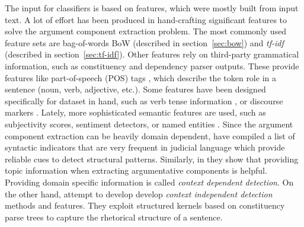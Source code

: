 The input for classifiers is based on features, which were mostly built from
input text.  A lot of effort has been produced in hand-crafting significant
features to solve the argument component extraction problem.  The most commonly
used feature sets are bag-of-words BoW (described in section~\ref{sec:bow}) and
\emph{tf-idf} (described in section~\ref{sec:tf-idf}). Other features rely on
third-party grammatical information, such as constituency and dependency parser
outputs. These provide features like part-of-speech (POS) tags
\citep{manning2011part}, which describe the token role in a sentence (noun,
verb, adjective, etc.).
Some features have been designed specifically for dataset in hand, such as verb
tense information \citep{palau2009argumentation, stab2014identifying}, or
discourse markers \citep{eckle2015role}. Lately, more sophisticated semantic
features are used,
such as subjectivity scores, sentiment detectors, or named entities \citep{levy2014context}.  
Since the argument component
extraction can be heavily domain dependent, \citet{palau2009argumentation} have
compiled a list of syntactic indicators that are very frequent in judicial
language which provide reliable cues to detect structural patterns. Similarly,
in \citep{levy2014context, rinott2015show} they show that providing topic
information when extracting argumentative components is helpful. Providing domain
specific information is called \emph{context dependent detection}. On the other
hand, \citet{lippi2015context} attempt to develop develop \emph{context independent
detection} methods and features. They exploit structured kernels based on
constituency parse trees to capture the rhetorical structure of a sentence. 

